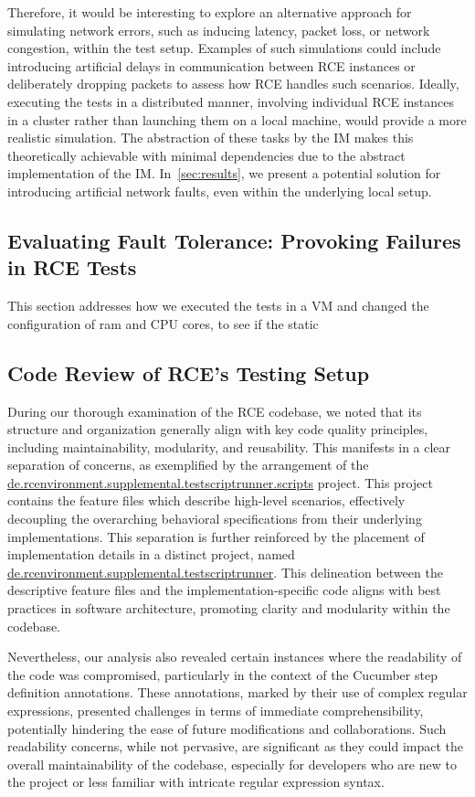 Therefore, it would be interesting to explore an alternative approach for simulating network errors, such as inducing latency, packet loss, or network congestion, within the test setup. Examples of such simulations could include introducing artificial delays in communication between \ac{RCE} instances or deliberately dropping packets to assess how \ac{RCE} handles such scenarios. Ideally, executing the tests in a distributed manner, involving individual \ac{RCE} instances in a cluster rather than launching them on a local machine, would provide a more realistic simulation. The abstraction of these tasks by the \ac{IM} makes this theoretically achievable with minimal dependencies due to the abstract implementation of the \ac{IM}. In~\cref{sec:results}, we present a potential solution for introducing artificial network faults, even within the underlying local setup.

\subsection{Evaluating Fault Tolerance: Provoking Failures in \ac{RCE} Tests}
This section addresses how we executed the tests in a VM and changed the configuration of ram and CPU cores, to see if the static

\subsection{Code Review of \ac{RCE}'s Testing Setup}
\label{subsec:CodeReview}

During our thorough examination of the \ac{RCE} codebase, we noted that its structure and organization generally align with key code quality principles, including maintainability, modularity, and reusability. This manifests in a clear separation of concerns, as exemplified by the arrangement of the \url{de.rcenvironment.supplemental.testscriptrunner.scripts} project. This project contains the feature files which describe high-level scenarios, effectively decoupling the overarching behavioral specifications from their underlying implementations. This separation is further reinforced by the placement of implementation details in a distinct project, named \url{de.rcenvironment.supplemental.testscriptrunner}. This delineation between the descriptive feature files and the implementation-specific code aligns with best practices in software architecture, promoting clarity and modularity within the codebase.




Nevertheless, our analysis also revealed certain instances where the readability of the code was compromised, particularly in the context of the Cucumber step definition annotations. These annotations, marked by their use of complex regular expressions, presented challenges in terms of immediate comprehensibility, potentially hindering the ease of future modifications and collaborations. Such readability concerns, while not pervasive, are significant as they could impact the overall maintainability of the codebase, especially for developers who are new to the project or less familiar with intricate regular expression syntax.

